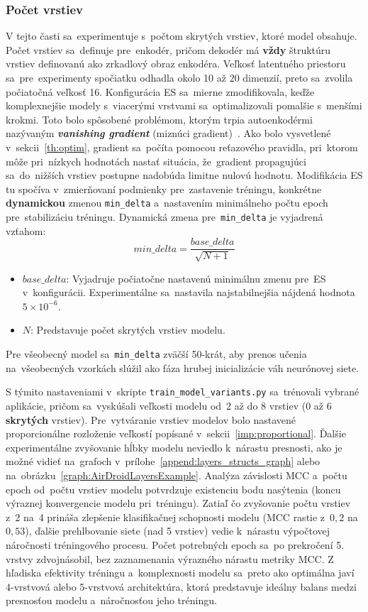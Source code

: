 \subsubsection{Počet vrstiev}
V tejto časti sa~experimentuje s~počtom skrytých vrstiev, ktoré model obsahuje. Počet vrstiev sa~definuje pre~enkodér, pričom dekodér má \textbf{vždy} štruktúru vrstiev definovanú ako zrkadlový obraz enkodéra. Veľkosť latentného priestoru sa~pre~experimenty spočiatku odhadla okolo 10 až 20 dimenzií, preto sa~zvolila počiatočná veľkosť 16. Konfigurácia ES sa~mierne zmodifikovala, keďže komplexnejšie modely s~viacerými vrstvami sa~optimalizovali pomalšie s~menšími krokmi. Toto bolo spôsobené problémom, ktorým trpia autoenkodérmi nazývaným \textit{\textbf{vanishing gradient}} (miznúci gradient)~\cite{mienye2025deep}. Ako bolo vysvetlené v~sekcii~\ref{th:optim}, gradient sa~počíta pomocou reťazového pravidla, pri~ktorom môže pri~nízkych hodnotách nastať situácia, že~gradient propagujúci sa~do~nižších vrstiev postupne nadobúda limitne nulovú hodnotu. Modifikácia ES tu spočíva v~zmierňovaní podmienky pre~zastavenie tréningu, konkrétne \textbf{dynamickou}\label{exp:dynamic_delta} zmenou \texttt{min\_delta} a~nastavením minimálneho počtu epoch pre~stabilizáciu tréningu. Dynamická zmena pre~\texttt{min\_delta} je vyjadrená vzťahom:
\begin{equation}
    min\_delta = \frac{base\_delta}{\sqrt{N + 1}}
\end{equation}
\begin{itemize}
    \item $base\_delta$: Vyjadruje počiatočne nastavenú minimálnu zmenu pre~ES v~konfigurácii. Experimentálne sa~nastavila najstabilnejšia nájdená hodnota $5\times10^{-6}$.
    \item $N$: Predstavuje počet skrytých vrstiev modelu. 
\end{itemize}
Pre všeobecný model sa~\texttt{min\_delta} zväčší 50-krát, aby prenos učenia na~všeobecných vzorkách slúžil ako fáza hrubej inicializácie váh neurónovej siete. 

S týmito nastaveniami v~skripte \texttt{train\_model\_variants.py} sa~trénovali vybrané aplikácie, pričom sa~vyskúšali veľkosti modelu od~2 až do 8 vrstiev (0 až 6 \textbf{skrytých} vrstiev). Pre~vytváranie vrstiev modelov bolo nastavené proporcionálne rozloženie veľkostí popísané v~sekcii~\ref{imp:proportional}. Ďalšie experimentálne zvyšovanie hĺbky modelu neviedlo k~nárastu presnosti, ako je možné vidieť na~grafoch v~prílohe~\ref{append:layers_structs_graph} alebo na~obrázku~\ref{graph:AirDroidLayersExample}. Analýza závislosti MCC a~počtu epoch od~počtu vrstiev modelu potvrdzuje existenciu bodu nasýtenia (koncu výraznej konvergencie modelu pri~tréningu). Zatiaľ čo zvyšovanie počtu vrstiev z~2 na~4 prináša zlepšenie klasifikačnej schopnosti modelu (MCC rastie z~$0,2$ na~$0,53$), ďalšie prehlbovanie siete (nad 5 vrstiev) vedie k~nárastu výpočtovej náročnosti tréningového procesu. Počet potrebných epoch sa~po prekročení 5. vrstvy zdvojnásobil, bez zaznamenania výrazného nárastu metriky MCC. Z hľadiska efektivity tréningu a~komplexnosti modelu sa~preto ako optimálna javí 4-vrstvová alebo 5-vrstvová architektúra, ktorá predstavuje ideálny balans medzi presnosťou modelu a~náročnosťou jeho tréningu.

